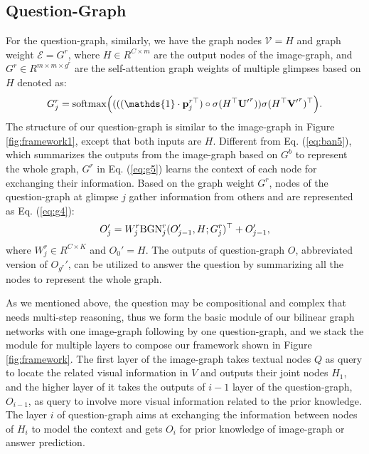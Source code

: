 \documentclass[10pt,twocolumn,letterpaper]{article}
\begin{document}
\subsection{Question-Graph}
For the question-graph, similarly, we have the graph nodes $\mathcal{V}=H$ and graph weight $\mathcal{E}=G^{r}$, where $H \in R^{C \times m}$ are the output nodes of the image-graph, and $G^{r} \in R^{m \times m \times g^r}$ are the self-attention graph weights of multiple glimpses based on $H$ denoted as:
\vspace{-5pt}
{\small
\begin{equation} \label{eq:g5}
G_{j}^{r} =\mathrm{softmax}\Big((((\mathds{1} \cdot \mathbf{p}_{j}^{r\top}) \circ \sigma(H^\top\mathbf{U'}^{r})) \sigma(H^\top \mathbf{V'}^r)^\top \Big).
\vspace{-5pt}
\end{equation}
}
The structure of our question-graph is similar to the image-graph in Figure \ref{fig:framework1}, except that both inputs are $H$. Different from Eq. (\ref{eq:ban5}), which summarizes the outputs from the image-graph based on $G^b$ to represent the whole graph, $G^r$ in Eq. (\ref{eq:g5}) learns the context of each node for exchanging their information. Based on the graph weight $G^r$, nodes of the question-graph at glimpse $j$ gather information from others and are represented as Eq. (\ref{eq:g4}):
\vspace{-5pt}
\begin{equation} \label{eq:g6}
O_j' = W^r_j\mathrm{BGN}^r_j(O_{j-1}', H; G^r_j)^\top + O_{j-1}',
\vspace{-5pt}
\end{equation}
where $W^r_j \in R^{C \times K}$ and $O_0' = H$. The outputs of question-graph $O$, abbreviated version of $O_{g^r}'$, can be utilized to answer the question by summarizing all the nodes to represent the whole graph.

As we mentioned above, the question may be compositional and complex that needs multi-step reasoning, thus we form the basic module of our bilinear graph networks with one image-graph following by one question-graph, and we stack the module for multiple layers to compose our framework shown in Figure \ref{fig:framework}. The first layer of the image-graph takes textual nodes $Q$ as query to locate the related visual information in $V$ and outputs their joint nodes $H_1$, and the higher layer of it takes the outputs of $i-1$ layer of the question-graph, $O_{i-1}$, as query to involve more visual information related to the prior knowledge. The layer $i$ of question-graph aims at exchanging the information between nodes of $H_i$ to model the context and gets $O_i$ for prior knowledge of image-graph or answer prediction.
\end{document}
